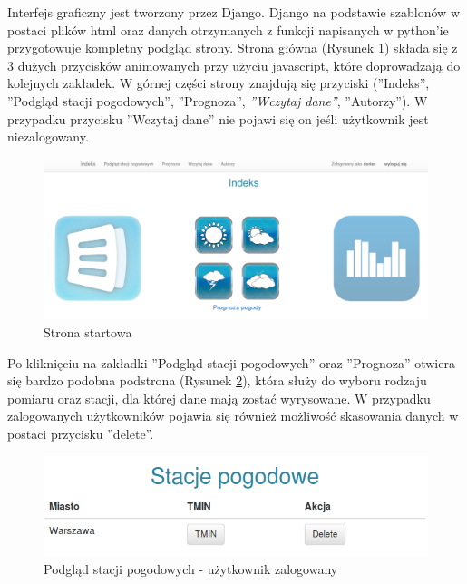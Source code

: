 Interfejs graficzny jest tworzony przez Django. Django na podstawie szablonów w postaci plików html oraz danych otrzymanych z funkcji napisanych w python'ie przygotowuje kompletny podgląd strony. 
Strona główna (Rysunek \ref{fig:stronaStartowa}) składa się z 3 dużych przycisków animowanych przy użyciu javascript, które doprowadzają do kolejnych zakładek. W górnej części strony znajdują się przyciski (''Indeks'', ''Podgląd stacji pogodowych'', ''Prognoza'', \textit{''Wczytaj dane''}, ''Autorzy''). W przypadku przycisku ''Wczytaj dane'' nie pojawi się on jeśli użytkownik jest niezalogowany. \newline 
\begin{figure}[p]
	\centering
	\includegraphics[width=\textheight, angle=90]{000}
	\caption{Strona startowa}
	\label{fig:stronaStartowa}
	\end{figure}

Po kliknięciu na zakładki ''Podgląd stacji pogodowych'' oraz ''Prognoza'' otwiera się bardzo podobna podstrona (Rysunek \ref{fig:podgladStacji}), która służy do wyboru rodzaju pomiaru oraz stacji, dla której dane mają zostać wyrysowane. W przypadku zalogowanych użytkowników pojawia się również możliwość skasowania danych w postaci przycisku ''delete''. 
\newline
\begin{figure}[p]
	\centering
	\includegraphics[width=\linewidth]{001}
	\caption{Podgląd stacji pogodowych - użytkownik zalogowany}
	\label{fig:podgladStacji}
	\end{figure}

